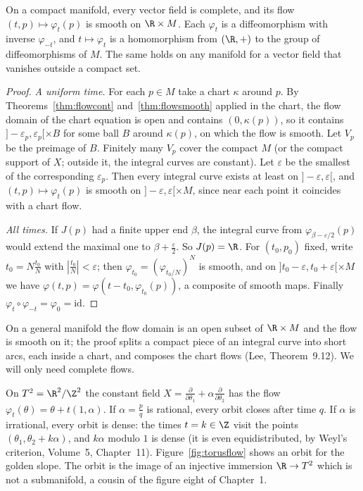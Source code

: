 \begin{theorem}\label{thm:complete}
On a compact manifold, every vector field is complete, and its flow $(t,p)\mapsto\varphi_t(p)$ is smooth on $\R\times M$. Each $\varphi_t$ is a diffeomorphism
with inverse $\varphi_{-t}$, and $t\mapsto\varphi_t$ is a homomorphism from $(\R,+)$ to the group of diffeomorphisms of $M$. The same holds on any
manifold for a vector field that vanishes outside a compact set.
\end{theorem}
\begin{proof}
\emph{A uniform time.} For each $p\in M$ take a chart $\kappa$ around $p$. By Theorems~\ref{thm:flowcont} and~\ref{thm:flowsmooth} applied in the chart, the flow
domain of the chart equation is open and contains $(0,\kappa(p))$, so it contains $]-\varepsilon_p,\varepsilon_p[\times B$ for some ball $B$ around $\kappa(p)$,
on which the flow is smooth. Let $V_p$ be the preimage of $B$. Finitely many $V_p$ cover the compact $M$ (or the compact support of $X$; outside it, the
integral curves are constant). Let $\varepsilon$ be the smallest of the corresponding $\varepsilon_p$. Then every integral curve exists at least on
$]-\varepsilon,\varepsilon[$, and $(t,p)\mapsto\varphi_t(p)$ is smooth on $]-\varepsilon,\varepsilon[\times M$, since near each point it coincides with a chart flow.

\emph{All times.} If $J(p)$ had a finite upper end $\beta$, the integral curve from $\varphi_{\beta-\varepsilon/2}(p)$ would extend the maximal one to
$\beta+\frac\varepsilon2$. So $J(p)=\R$. For $(t_0,p_0)$ fixed, write $t_0=N\frac{t_0}N$ with $|\frac{t_0}N|<\varepsilon$; then $\varphi_{t_0}=(\varphi_{t_0/N})^N$ is
smooth, and on $]t_0-\varepsilon,t_0+\varepsilon[\times M$ we have $\varphi(t,p)=\varphi(t-t_0,\varphi_{t_0}(p))$, a composite of smooth maps. Finally
$\varphi_t\circ\varphi_{-t}=\varphi_0=\mathrm{id}$.
\end{proof}

\begin{remark}
On a general manifold the flow domain is an open subset of $\R\times M$ and the flow is smooth on it; the proof splits a compact piece of an integral
curve into short arcs, each inside a chart, and composes the chart flows (Lee, Theorem~9.12). We will only need complete flows.
\end{remark}

\begin{example}\label{ex:torusflow}
On $T^2=\R^2/\Z^2$ the constant field $X=\frac\partial{\partial\theta_1}+\alpha\frac\partial{\partial\theta_2}$ has the flow
$\varphi_t(\theta)=\theta+t(1,\alpha)$. If $\alpha=\frac pq$ is rational, every orbit closes after time $q$. If $\alpha$ is irrational, every orbit is dense:
the times $t=k\in\Z$ visit the points $(\theta_1,\theta_2+k\alpha)$, and $k\alpha$ modulo $1$ is dense (it is even equidistributed, by Weyl's criterion, Volume~5, Chapter~11). Figure~\ref{fig:torusflow}
shows an orbit for the golden slope. The orbit is the image of an injective immersion $\R\to T^2$ which is not a submanifold, a cousin of the
figure eight of Chapter~1.
\end{example}

